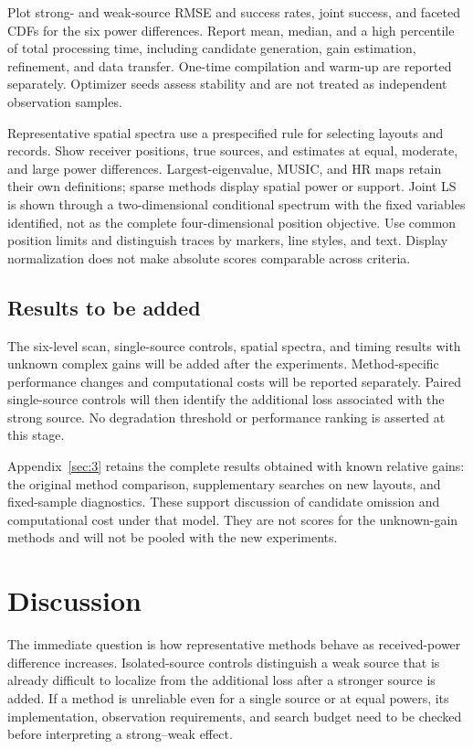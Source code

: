 Plot strong- and weak-source RMSE and success rates, joint success, and faceted CDFs for the six power differences. Report mean, median, and a high percentile of total processing time, including candidate generation, gain estimation, refinement, and data transfer. One-time compilation and warm-up are reported separately. Optimizer seeds assess stability and are not treated as independent observation samples.

Representative spatial spectra use a prespecified rule for selecting layouts and records. Show receiver positions, true sources, and estimates at equal, moderate, and large power differences. Largest-eigenvalue, MUSIC, and HR maps retain their own definitions; sparse methods display spatial power or support. Joint LS is shown through a two-dimensional conditional spectrum with the fixed variables identified, not as the complete four-dimensional position objective. Use common position limits and distinguish traces by markers, line styles, and text. Display normalization does not make absolute scores comparable across criteria.

\subsection{Results to be added}\label{sec:ug-results}
The six-level scan, single-source controls, spatial spectra, and timing results with unknown complex gains will be added after the experiments. Method-specific performance changes and computational costs will be reported separately. Paired single-source controls will then identify the additional loss associated with the strong source. No degradation threshold or performance ranking is asserted at this stage.

Appendix~\ref{sec:3} retains the complete results obtained with known relative gains: the original method comparison, supplementary searches on new layouts, and fixed-sample diagnostics. These support discussion of candidate omission and computational cost under that model. They are not scores for the unknown-gain methods and will not be pooled with the new experiments.

\section{Discussion}\label{sec:ug-discussion}
The immediate question is how representative methods behave as received-power difference increases. Isolated-source controls distinguish a weak source that is already difficult to localize from the additional loss after a stronger source is added. If a method is unreliable even for a single source or at equal powers, its implementation, observation requirements, and search budget need to be checked before interpreting a strong--weak effect.

